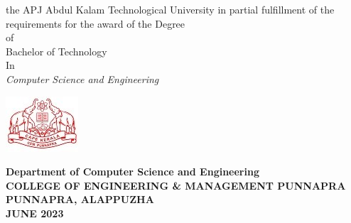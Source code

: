 \begin{titlepage}
\begin{center}
	         \normalsize
	         \vspace{0.1cm}
	         the APJ Abdul Kalam Technological University in partial fulfillment of the requirements for the award of  the Degree \\
	         \vspace{0.5cm}
	         of\\
	         \vspace{1cm}
	         Bachelor of Technology\\
	            In\\
	            \textit{ Computer Science and Engineering}\\
	\vspace{1cm}
	
		\begin{center}
	    	\includegraphics[]{am.jpg}
	\end{center}\vspace{1cm}
		\normalsize
		
		\textbf{Department of Computer Science and Engineering}\\[0.2cm]
		\textbf{COLLEGE OF ENGINEERING \& MANAGEMENT PUNNAPRA}\\[0.2cm]
		\textbf{PUNNAPRA, ALAPPUZHA}\\[0.2cm]
		\textbf{JUNE 2023}\\
	\end{center}
\end{titlepage}




